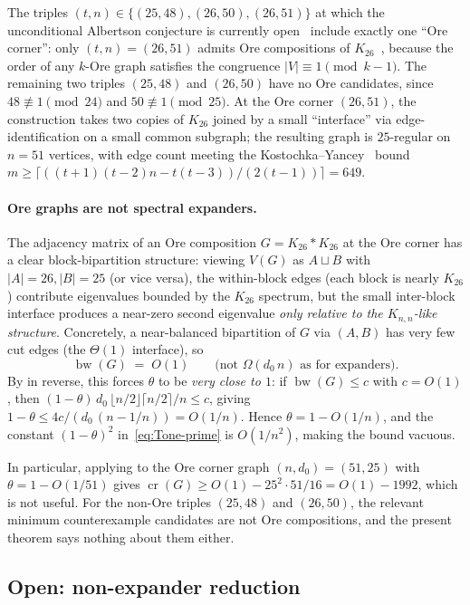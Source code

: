 \documentclass[11pt,a4paper]{article}
\theoremstyle{definition}
\DeclareMathOperator{\crN}{cr}
\DeclareMathOperator{\bw}{bw}
\begin{document}
The triples $(t, n) \in \{(25, 48), (26, 50), (26, 51)\}$ at which
the unconditional Albertson conjecture is currently
open~\cite{Cranston} include exactly one ``Ore corner'': only
$(t, n) = (26, 51)$ admits Ore compositions of $K_{26}$~\cite{Ore},
because the order of any $k$-Ore graph satisfies the congruence
$|V| \equiv 1 \pmod{k - 1}$. The remaining two triples
$(25, 48)$ and $(26, 50)$ have no Ore candidates, since
$48 \not\equiv 1 \pmod{24}$ and $50 \not\equiv 1 \pmod{25}$.
At the Ore corner $(26, 51)$, the construction takes two copies
of $K_{26}$ joined by a small ``interface'' via edge-identification
on a small common subgraph; the resulting graph is $25$-regular on
$n = 51$ vertices, with edge count meeting the
Kostochka--Yancey~\cite{KostochkaYancey} bound
$m \ge \lceil ((t+1)(t-2) n - t(t-3))/(2(t-1)) \rceil = 649$.

\paragraph{Ore graphs are not spectral expanders.}
The adjacency matrix of an Ore composition $G = K_{26} * K_{26}$ at
the Ore corner has a clear block-bipartition structure: viewing
$V(G)$ as $A \sqcup B$ with $|A| = 26, |B| = 25$ (or vice versa),
the within-block edges (each block is nearly $K_{26}$) contribute
eigenvalues bounded by the $K_{26}$ spectrum, but the small
inter-block interface produces a near-zero second eigenvalue
\emph{only relative to the $K_{n,n}$-like structure}. Concretely,
a near-balanced bipartition of $G$ via $(A, B)$ has very few cut
edges (the $\Theta(1)$ interface), so
\[
   \bw(G) \;=\; O(1) \qquad \text{(not $\Omega(d_0\,n)$ as for expanders)}.
\]
By  in reverse, this forces $\theta$ to be
\emph{very close to $1$}: if $\bw(G) \le c$ with $c = O(1)$, then
$(1 - \theta)\,d_0\,\lfloor n/2 \rfloor \lceil n/2 \rceil / n \le c$,
giving $1 - \theta \le 4 c / (d_0\,(n - 1/n))= O(1/n)$. Hence
$\theta = 1 - O(1/n)$, and the constant $(1 - \theta)^{2}$
in~\eqref{eq:Tone-prime} is $O(1/n^{2})$, making the bound vacuous.

In particular, applying  to the Ore corner graph
$(n, d_0) = (51, 25)$ with $\theta = 1 - O(1/51)$ gives
$\crN(G) \ge O(1) - 25^{2} \cdot 51 / 16 = O(1) - 1992$, which is
not useful. For the non-Ore triples $(25, 48)$ and $(26, 50)$,
the relevant minimum counterexample candidates are not Ore
compositions, and the present theorem says nothing about them
either.

\subsection{Open: non-expander reduction}\label{ssec:reduction}
\end{document}
